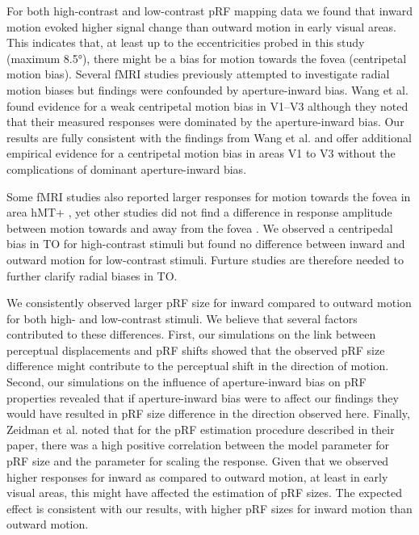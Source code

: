 For both high-contrast and low-contrast pRF mapping data we found that inward motion evoked higher signal change than outward motion in early visual areas. This indicates that, at least up to the eccentricities probed in this study (maximum 8.5°), there might be a bias for motion towards the fovea (centripetal motion bias). Several fMRI studies \parencite{Raemaekers2009, Schellekens2013, Maloney2014} previously attempted to investigate radial motion biases but findings were confounded by aperture-inward bias. Wang et al. \parencite*{Wang2014} found evidence for a weak centripetal motion bias in V1–V3 although they noted that their measured responses were dominated by the aperture-inward bias. Our results are fully consistent with the findings from Wang et al. \parencite*{Wang2014} and offer additional empirical evidence for a centripetal motion bias in areas V1 to V3 without the complications of dominant aperture-inward bias.

Some fMRI studies also reported larger responses for motion towards the fovea in area hMT+ \parencite{Giaschi2007, Wang2014}, yet other studies did not find a difference in response amplitude between motion towards and away from the fovea \parencite{Raemaekers2009, Beckett2012}. We observed a centripedal bias in TO for high-contrast stimuli but found no difference between inward and outward motion for low-contrast stimuli. Furture studies are therefore needed to further clarify radial biases in TO.

We consistently observed larger pRF size for inward compared to outward motion for both high- and low-contrast stimuli. We believe that several factors contributed to these differences. First, our simulations on the link between perceptual displacements and pRF shifts showed that the observed pRF size difference might contribute to the perceptual shift in the direction of motion. Second, our simulations on the influence of aperture-inward bias on pRF properties revealed that if aperture-inward bias were to affect our findings they would have resulted in pRF size difference in the direction observed here. Finally, Zeidman et al. \parencite*{Zeidman2017} noted that for the pRF estimation procedure described in their paper, there was a high positive correlation between the model parameter for pRF size and the parameter for scaling the response. Given that we observed higher responses for inward as compared to outward motion, at least in early visual areas, this might have affected the estimation of pRF sizes. The expected effect is consistent with our results, with higher pRF sizes for inward motion than outward motion.

